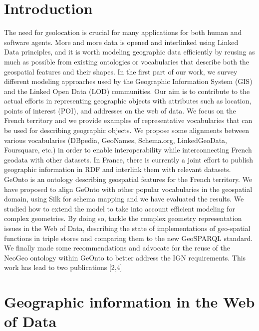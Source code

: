 \documentclass[a4paper,11pt]{report}
\begin{document}
\section{Introduction}
The need for geolocation is crucial for many applications for both human and software agents. More and more data is opened and interlinked using Linked Data principles, and it is worth modeling geographic data efficiently by reusing as much as possible from existing ontologies or vocabularies that describe both the geospatial features and their shapes. In the first part of our work, we survey different modeling approaches used by the Geographic Information System (GIS) and the Linked Open Data (LOD) communities. Our aim is to contribute to the actual efforts in representing geographic objects with attributes such as location, points of interest (POI), and addresses on the web of data. We focus on the French territory and we provide examples of representative vocabularies that can be used for describing geographic objects. We propose some alignments between various vocabularies (DBpedia, GeoNames, Schema.org, LinkedGeoData, Foursquare, etc.) in order to enable interoperability while interconnecting French geodata with other datasets. In France, there is  currently a joint effort to publish geographic information in RDF  and interlink them with relevant datasets. GeOnto is an ontology describing geospatial features for the French territory. We have proposed to align GeOnto with other popular vocabularies in the geospatial domain, using Silk for schema mapping and we have evaluated the results. We studied how to extend the model to take into account efficient modeling for complex geometries. By doing so, tackle the complex geometry representation issues in the Web of Data, describing the state of implementations of geo-spatial functions in triple stores and comparing them to the new GeoSPARQL standard.  We finally made some recommendations and advocate for the reuse of the NeoGeo ontology within GeOnto to better address the IGN requirements.
This work has lead to two publications [2,4]

\section{Geographic information in the Web of Data}                         \label{sec:geo-in-web-of-data}
\end{document}

